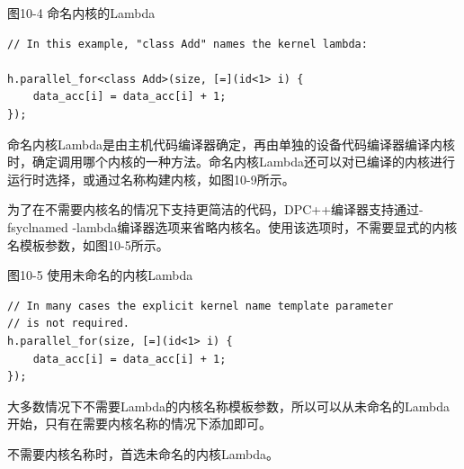 \hspace*{\fill} \par %
图10-4 命名内核的Lambda
\begin{lstlisting}[caption={}]
// In this example, "class Add" names the kernel lambda:

h.parallel_for<class Add>(size, [=](id<1> i) {
	data_acc[i] = data_acc[i] + 1;
});
\end{lstlisting}

命名内核Lambda是由主机代码编译器确定，再由单独的设备代码编译器编译内核时，确定调用哪个内核的一种方法。命名内核Lambda还可以对已编译的内核进行运行时选择，或通过名称构建内核，如图10-9所示。\par

为了在不需要内核名的情况下支持更简洁的代码，DPC++编译器支持通过-fsyclnamed -lambda编译器选项来省略内核名。使用该选项时，不需要显式的内核名模板参数，如图10-5所示。\par

\hspace*{\fill} \par %
图10-5 使用未命名的内核Lambda
\begin{lstlisting}[caption={}]
// In many cases the explicit kernel name template parameter
// is not required.
h.parallel_for(size, [=](id<1> i) {
	data_acc[i] = data_acc[i] + 1;
});
\end{lstlisting}

大多数情况下不需要Lambda的内核名称模板参数，所以可以从未命名的Lambda开始，只有在需要内核名称的情况下添加即可。\par

\begin{tcolorbox}[colback=red!5!white,colframe=red!75!black]
不需要内核名称时，首选未命名的内核Lambda。
\end{tcolorbox}



















